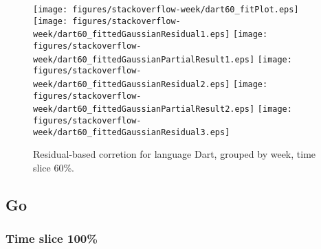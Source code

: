 \begin{figure}[t]
\centering
{}
{\texttt{[image: figures/stackoverflow-week/dart60\_fitPlot.eps]}}
{\texttt{[image: figures/stackoverflow-week/dart60\_fittedGaussianResidual1.eps]}}
{\texttt{[image: figures/stackoverflow-week/dart60\_fittedGaussianPartialResult1.eps]}}
{\texttt{[image: figures/stackoverflow-week/dart60\_fittedGaussianResidual2.eps]}}
{\texttt{[image: figures/stackoverflow-week/dart60\_fittedGaussianPartialResult2.eps]}}
{\texttt{[image: figures/stackoverflow-week/dart60\_fittedGaussianResidual3.eps]}}
\caption{Residual-based corretion for language Dart, grouped by week, time slice 60\%.}
\end{figure}


\FloatBarrier


\subsection{Go}

\subsubsection{Time slice 100\%}

